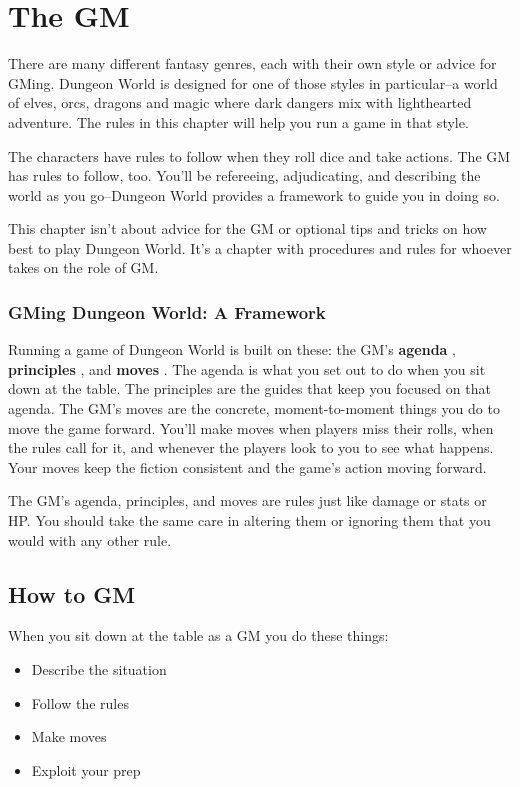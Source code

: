 \chapter{The GM}


 There are many different fantasy genres, each with their own style or advice for GMing. Dungeon World is designed for one of those styles in particular--a world of elves, orcs, dragons and magic where dark dangers mix with lighthearted adventure. The rules in this chapter will help you run a game in that style.


 The characters have rules to follow when they roll dice and take actions. The GM has rules to follow, too. You'll be refereeing, adjudicating, and describing the world as you go--Dungeon World provides a framework to guide you in doing so.


 This chapter isn't about advice for the GM or optional tips and tricks on how best to play Dungeon World. It's a chapter with procedures and rules for whoever takes on the role of GM.
\subsection{GMing Dungeon World: A Framework}


 Running a game of Dungeon World is built on these: the GM's \textbf{agenda}
, \textbf{principles}
, and \textbf{moves}
. The agenda is what you set out to do when you sit down at the table. The principles are the guides that keep you focused on that agenda. The GM's moves are the concrete, moment-to-moment things you do to move the game forward. You'll make moves when players miss their rolls, when the rules call for it, and whenever the players look to you to see what happens. Your moves keep the fiction consistent and the game's action moving forward.


 The GM's agenda, principles, and moves are rules just like damage or stats or HP. You should take the same care in altering them or ignoring them that you would with any other rule.
\section{How to GM}


 When you sit down at the table as a GM you do these things:
\begin{itemize}
\item Describe the situation
\item Follow the rules
\item Make moves
\item Exploit your prep

\end{itemize}


